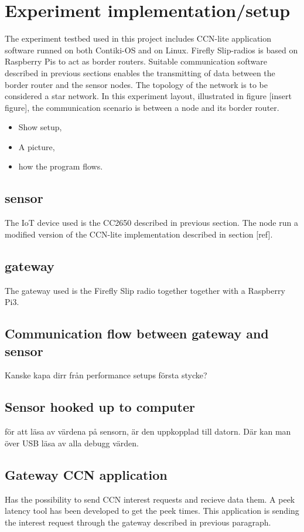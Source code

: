 \section{Experiment implementation/setup}
The experiment testbed used in this project includes CCN-lite application software runned on both Contiki-OS and on Linux. Firefly Slip-radios is based on Raspberry Pis to act as border routers. Suitable communication software described in previous sections enables the transmitting of data between the border router and the sensor nodes. The topology of the network is to be considered a star network. In this experiment layout, illustrated in figure [insert figure], the communication scenario is between a node and its border router.



\begin{itemize}
	\item Show setup,
	\item A picture,
	\item how the program flows.

\end{itemize}
\subsection{sensor}
The IoT device used is the CC2650 described in previous section. The node run a modified version of the CCN-lite implementation described in section [ref].

\subsection{gateway}
The gateway used is the Firefly Slip radio together together with a Raspberry Pi3. 


\subsection{Communication flow between gateway and sensor}
Kanske kapa dirr från performance setups första stycke?

\subsection{Sensor hooked up to computer}
för att läsa av värdena på sensorn, är den uppkopplad till datorn. Där kan man över USB läsa av alla debugg värden.

\subsection{Gateway CCN application}
Has the possibility to send CCN interest requests and recieve data them. A peek latency tool has been developed to get the peek times.
This application is sending the interest request through the gateway described in previous paragraph.

